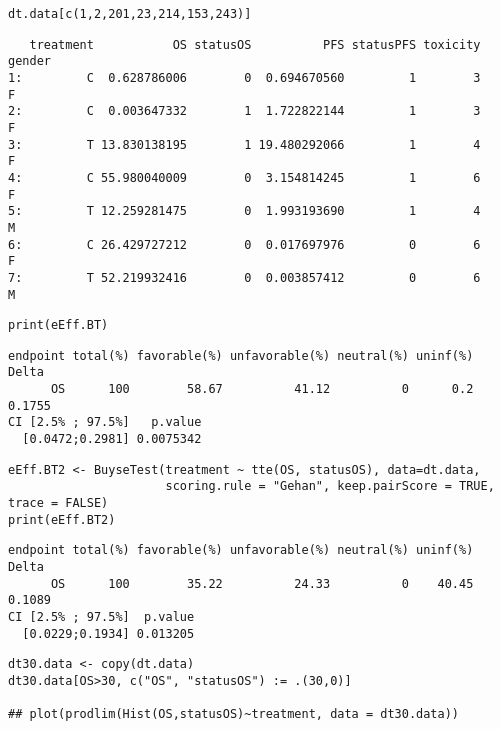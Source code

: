 \documentclass[12pt]{article}
\begin{document}
\lstset{language=r,label= ,caption= ,captionpos=b,numbers=none}
\begin{lstlisting}
dt.data[c(1,2,201,23,214,153,243)]
\end{lstlisting}

\begin{verbatim}
   treatment           OS statusOS          PFS statusPFS toxicity gender
1:         C  0.628786006        0  0.694670560         1        3      F
2:         C  0.003647332        1  1.722822144         1        3      F
3:         T 13.830138195        1 19.480292066         1        4      F
4:         C 55.980040009        0  3.154814245         1        6      F
5:         T 12.259281475        0  1.993193690         1        4      M
6:         C 26.429727212        0  0.017697976         0        6      F
7:         T 52.219932416        0  0.003857412         0        6      M
\end{verbatim}


\lstset{language=r,label= ,caption= ,captionpos=b,numbers=none}
\begin{lstlisting}
print(eEff.BT)
\end{lstlisting}

\begin{verbatim}
endpoint total(%) favorable(%) unfavorable(%) neutral(%) uninf(%)  Delta
      OS      100        58.67          41.12          0      0.2 0.1755
CI [2.5% ; 97.5%]   p.value
  [0.0472;0.2981] 0.0075342
\end{verbatim}


\lstset{language=r,label= ,caption= ,captionpos=b,numbers=none}
\begin{lstlisting}
eEff.BT2 <- BuyseTest(treatment ~ tte(OS, statusOS), data=dt.data,
                      scoring.rule = "Gehan", keep.pairScore = TRUE, trace = FALSE)
print(eEff.BT2)
\end{lstlisting}

\begin{verbatim}
endpoint total(%) favorable(%) unfavorable(%) neutral(%) uninf(%)  Delta
      OS      100        35.22          24.33          0    40.45 0.1089
CI [2.5% ; 97.5%]  p.value
  [0.0229;0.1934] 0.013205
\end{verbatim}


\lstset{language=r,label= ,caption= ,captionpos=b,numbers=none}
\begin{lstlisting}
dt30.data <- copy(dt.data)
dt30.data[OS>30, c("OS", "statusOS") := .(30,0)]

## plot(prodlim(Hist(OS,statusOS)~treatment, data = dt30.data))
\end{lstlisting}
\end{document}
